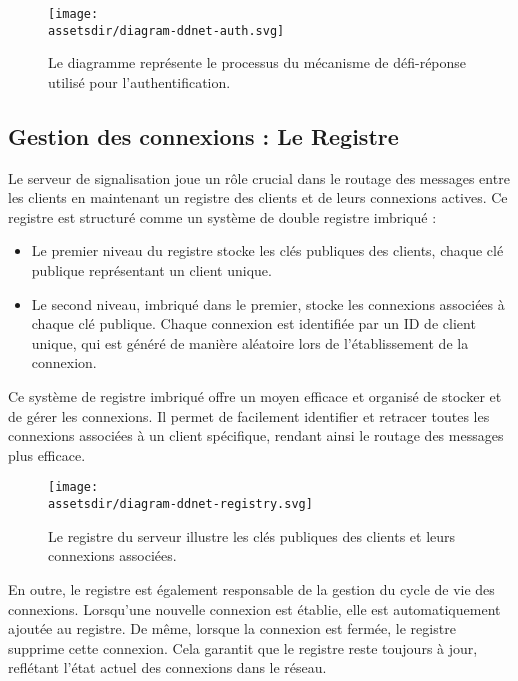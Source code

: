 \begin{figure}[H]
  \begin{center}
    \texttt{[image: \\assetsdir/diagram-ddnet-auth.svg]} %
  \end{center}
  \caption[Mécanisme de Défi-Réponse]{Le diagramme représente le processus du mécanisme de défi-réponse utilisé pour l'authentification.}
\end{figure}

\subsection{Gestion des connexions : Le Registre}

Le serveur de signalisation joue un rôle crucial dans le routage des messages entre les clients en maintenant un registre des clients et de leurs connexions actives. Ce registre est structuré comme un système de double registre imbriqué :

\begin{itemize}
  \item Le premier niveau du registre stocke les clés publiques des clients, chaque clé publique représentant un client unique.
  \item Le second niveau, imbriqué dans le premier, stocke les connexions associées à chaque clé publique. Chaque connexion est identifiée par un ID de client unique, qui est généré de manière aléatoire lors de l'établissement de la connexion.
\end{itemize}

Ce système de registre imbriqué offre un moyen efficace et organisé de stocker et de gérer les connexions. Il permet de facilement identifier et retracer toutes les connexions associées à un client spécifique, rendant ainsi le routage des messages plus efficace.

\begin{figure}[H]
  \begin{center}
    \texttt{[image: \\assetsdir/diagram-ddnet-registry.svg]}
  \end{center}
  \caption[Registre et Connexions]{Le registre du serveur illustre les clés publiques des clients et leurs connexions associées.}
\end{figure}

En outre, le registre est également responsable de la gestion du cycle de vie des connexions. Lorsqu'une nouvelle connexion est établie, elle est automatiquement ajoutée au registre. De même, lorsque la connexion est fermée, le registre supprime cette connexion. Cela garantit que le registre reste toujours à jour, reflétant l'état actuel des connexions dans le réseau.

